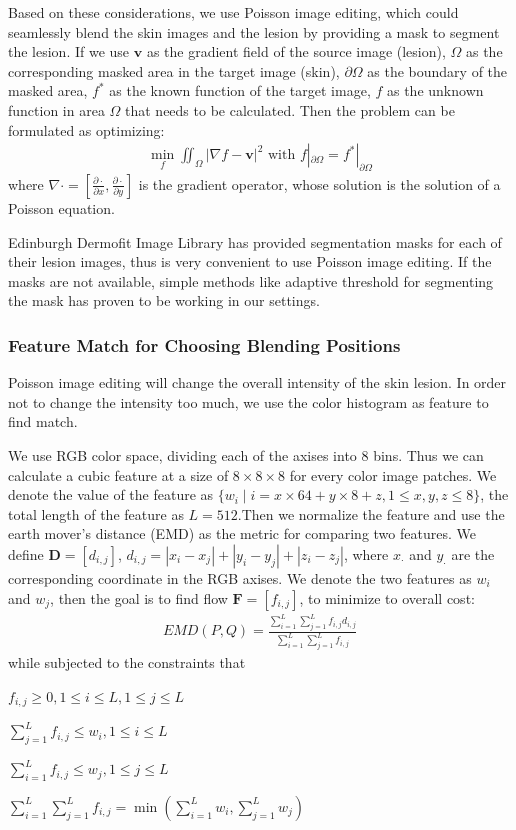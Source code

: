\documentclass[letterpaper]{article}
\begin{document}
Based on these considerations, we use Poisson image editing, which could seamlessly blend the skin images and the lesion by providing a mask to segment the lesion. If we use $\mathbf{v}$ as the gradient field of the source image (lesion), $\Omega$ as the corresponding masked area in the target image (skin), $\partial\Omega$ as the boundary of the masked area, $f^*$ as the known function of the target image, $f$ as the unknown function in area $\Omega$ that needs to be calculated. Then the problem can be formulated as optimizing:
\begin{align}
  \min_f \iint_\Omega |\nabla f - \mathbf{v}|^2 \text{ with } f|_{\partial\Omega} = f^*|_{\partial\Omega}
  \label{eqn:poisson}
\end{align}
where $\nabla\cdot = [\frac{\partial\cdot}{\partial x},\frac{\partial\cdot}{\partial y}]$ is the gradient operator, whose solution is the solution of a Poisson equation.

Edinburgh Dermofit Image Library has provided segmentation masks for each of their lesion images, thus is very convenient to use Poisson image editing. If the masks are not available, simple methods like adaptive threshold for segmenting the mask has proven to be working in our settings. 

\subsubsection{Feature Match for Choosing Blending Positions}

Poisson image editing will change the overall intensity of the skin lesion. In order not to change the intensity too much, we use the color histogram as feature to find match. 

We use RGB color space, dividing each of the axises into 8 bins. Thus we can calculate a cubic feature at a size of $8\times8\times8$ for every color image patches. We denote the value of the feature as $\{w_i\mid i = x\times64 + y\times8 + z, 1 \le x, y, z \le 8\}$, the total length of the feature as $L=512$.Then we normalize the feature and use the earth mover's distance (EMD) as the metric for comparing two features. We define $\mathbf{D} = [d_{i,j}]$, $d_{i,j} = |x_i - x_j| + |y_i - y_j| + |z_i - z_j|$, where $x_\cdot$ and $y_\cdot$ are the corresponding coordinate in the RGB axises. We denote the two features as ${w_i}$ and ${w_j}$, then the goal is to find flow $\mathbf{F} = [f_{i,j}]$, to minimize to overall cost:
\begin{align}
  EMD(P, Q) = \frac{\sum^L_{i=1}\sum^L_{j=1}f_{i,j}d_{i,j}}{\sum^L_{i=1}\sum^L_{j=1}f_{i,j}}
\end{align}
while subjected to the constraints that \par
$f_{i,j}\ge0, 1\le i\le L, 1\le j\le L$ \par
$\sum_{j=1}^L f_{i,j}\le w_i, 1\le i\le L$ \par
$\sum_{i=1}^L f_{i,j}\le w_j, 1\le j\le L$ \par
$\sum_{i=1}^L\sum_{j=1}^L f_{i,j} = \min(\sum_{i=1}^L w_i, \sum_{j=1}^L w_j)$
\end{document}
